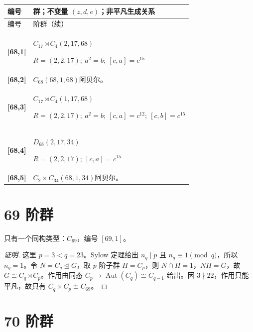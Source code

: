 \documentclass[UTF8,fontset=fandol,11pt,a4paper]{ctexart}
\newcommand{\Aut}{\operatorname{Aut}}\newcommand{\GL}{\operatorname{GL}}\newcommand{\ord}{\operatorname{ord}}\newcommand{\Z}{\mathrm Z}
\begin{document}
\begin{longtable}{@{}p{17mm}>{\raggedright\arraybackslash}p{141mm}@{}}

\toprule 编号 & 群；不变量 $(z,d,e)$；非平凡生成关系\\\midrule\endfirsthead

\toprule 编号 & 68 阶群（续）\\\midrule\endhead\bottomrule\endfoot

\textbf{[68,1]} & $C_{17}\rtimes C_{4}$\quad $(2,17,68)$\par\(R=(2,2,17);\allowbreak\ a^{2}=b;\allowbreak\ [c,a]=c^{15}\)\\[3pt]

\textbf{[68,2]} & $C_{68}$\quad $(68,1,68)$\quad 阿贝尔。\\[3pt]

\textbf{[68,3]} & $C_{17}\rtimes C_{4}$\quad $(1,17,68)$\par\(R=(2,2,17);\allowbreak\ a^{2}=b;\allowbreak\ [c,a]=c^{12};\allowbreak\ [c,b]=c^{15}\)\\[3pt]

\textbf{[68,4]} & $D_{68}$\quad $(2,17,34)$\par\(R=(2,2,17);\allowbreak\ [c,a]=c^{15}\)\\[3pt]

\textbf{[68,5]} & $C_{2}\times C_{34}$\quad $(68,1,34)$\quad 阿贝尔。\\[3pt]

\end{longtable}\endgroup

\section*{69 阶群}\label{order:69}

只有一个同构类型：$C_{69}$，编号 $[69,1]$。

\begin{proof}[证明]
这里 $p=3<q=23$。Sylow 定理给出 $n_q\mid p$ 且 $n_q\equiv1\pmod q$，所以 $n_q=1$。令 $N=C_q\trianglelefteq G$，取 $p$ 阶子群 $H=C_p$，则 $N\cap H=1$，$NH=G$，故 $G\cong C_q\rtimes C_p$。作用由同态 $C_p\to\Aut(C_q)\cong C_{q-1}$ 给出。因 $3\nmid 22$，作用只能平凡，故只有 $C_q\times C_p\cong C_{69}$。
\end{proof}

\section*{70 阶群}\label{order:70}
\end{document}

